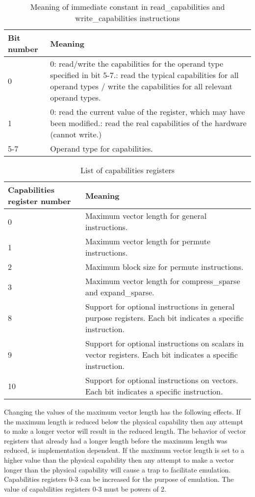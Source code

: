 \documentclass[forwardcom.tex]{subfiles}
\begin{document}
\begin{longtable} {|p{20mm}|p{90mm}|}
\caption{Meaning of immediate constant in read\_capabilities and write\_capabilities instructions} 
\label{table:readWriteCapabilitiesModes} \\
\endfirsthead
\endhead
\hline
\bfseries Bit number & \bfseries Meaning  \\
\hline
0  &  0: read/write the capabilities for the operand type specified in bit 5-7.\newline
      1: read the typical capabilities for all operand types / write the capabilities for all    
      relevant operand types.  \\
\hline
1  &  0: read the current value of the register, which may have been modified.\newline
      1: read the real capabilities of the hardware (cannot write.) \\
\hline
5-7 & Operand type for capabilities. \\
\hline
\end{longtable}


\begin{longtable} {|p{20mm}|p{90mm}|}
\caption{List of capabilities registers} 
\label{table:capabilitiesRegisters} \\
\endfirsthead
\endhead
\hline
\bfseries Capabilities register number & \bfseries Meaning  \\
\hline
0  &  Maximum vector length for general instructions. \\
\hline
1  &  Maximum vector length for permute instructions. \\
\hline
2  &  Maximum block size for permute instructions. \\
\hline
3  &  Maximum vector length for compress\_sparse and expand\_sparse. \\
\hline
8  &  Support for optional instructions in general purpose registers. Each bit indicates a specific instruction. \\
\hline
9  &  Support for optional instructions on scalars in vector registers. Each bit indicates a specific instruction. \\
\hline
10 &  Support for optional instructions on vectors. Each bit indicates a specific instruction. \\
\hline
\end{longtable}

Changing the values of the maximum vector length has the following effects. If the maximum length is reduced below the physical capability then any attempt to make a longer vector will result in the reduced length. The behavior of vector registers that already had a longer length before the maximum length was reduced, is implementation dependent. If the maximum vector length is set to a higher value than the physical capability then any attempt to make a vector longer than the physical capability will cause a trap to facilitate emulation. Capabilities registers 0-3 can be increased for the purpose of emulation. The value of capabilities registers 0-3 must be powers of 2.
\vspace{2mm}
\end{document}
